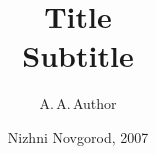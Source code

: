 \documentclass[oneside,a4paper,10pt]{book}
\begin{document}
\title{
    {
        \fontsize{35.83}{42.996}\sffamily\bfseries
        Title
    }
    \\[1cm]
    \sffamily\bfseries
    Subtitle
    \vspace{2cm}
}

\author{A.\,A.\,Author}
\date{Nizhni Novgorod, 2007}

\maketitle
\tableofcontents


%


%
\end{document}
